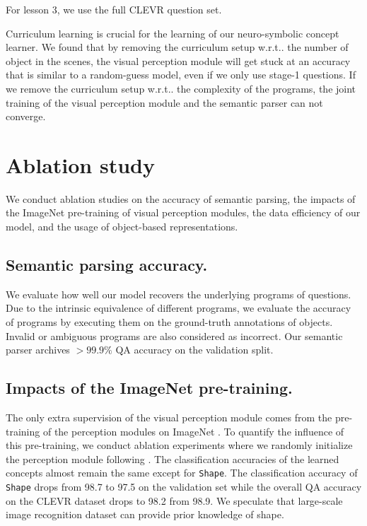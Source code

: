 \documentclass{article} %
\makeatletter
\DeclareRobustCommand\onedot{\futurelet\@let@token\@onedot}
\def\@onedot{\ifx\@let@token.\else.\null\fi\xspace}
\def\wrt{w.r.t\onedot} \def\dof{d.o.f\onedot}
\newcommand{\modelfull}{neuro-symbolic concept learner\xspace}
\makeatother
\begin{document}
For lesson 3, we use the full CLEVR question set.

Curriculum learning is crucial for the learning of our \modelfull. We found that by removing the curriculum setup \wrt the number of object in the scenes, the visual perception module will get stuck at an accuracy that is similar to a random-guess model, even if we only use stage-1 questions. If we remove the curriculum setup \wrt the complexity of the programs, the joint training of the visual perception module and the semantic parser can not converge.

\section{Ablation study}
\label{sec:app:visualization}
We conduct ablation studies on the accuracy of semantic parsing, the impacts of the ImageNet pre-training of visual perception modules, the data efficiency of our model, and the usage of object-based representations.

\subsection{Semantic parsing accuracy.}
We evaluate how well our model recovers the underlying programs of questions. Due to the intrinsic equivalence of different programs, we evaluate the accuracy of programs by executing them on the ground-truth annotations of objects. Invalid or ambiguous programs are also considered as incorrect. Our semantic parser archives $> 99.9\%$ QA accuracy on the validation split.

\subsection{Impacts of the ImageNet pre-training.} The only extra supervision of the visual perception module comes from the pre-training of the perception modules on ImageNet \citep{Deng2009Imagenet}.  To quantify the influence of this pre-training, we conduct ablation experiments where we randomly initialize the perception module following \citet{He2015Deep}. The classification accuracies of the learned concepts almost remain the same except for \texttt{Shape}. The classification accuracy of \texttt{Shape} drops from 98.7 to 97.5 on the validation set while the overall QA accuracy on the CLEVR dataset drops to 98.2 from 98.9. We speculate that large-scale image recognition dataset can provide prior knowledge of shape.
\end{document}

